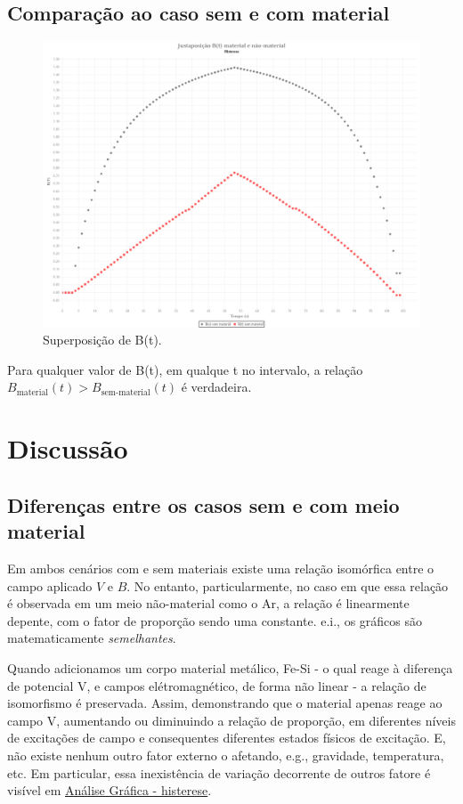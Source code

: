 \documentclass[11pt]{article}
\begin{document}
\subsection{Comparação ao caso sem e com material}
\label{sec:org3054bfb}
{\begin{figure}[htbp]

\includegraphics[width=.9\linewidth]{img-plots/B-justaposicao.png}
\caption{Superposição de B(t).}
\end{figure}}

Para qualquer valor de B(t), em qualque t no intervalo, a relação \(B_{\textrm{material}}(t)>B_{\textrm{sem-material}}(t)\) é verdadeira.

\section{Discussão}
\label{sec:orgeaf30e7}

\subsection{Diferenças entre os casos sem e com meio material}
\label{sec:orgd724b12}
Em ambos cenários  com e sem materiais existe uma relação isomórfica entre o campo aplicado \(V\) e \(B\). No entanto, particularmente, no caso em que essa relação é observada em um meio não-material como o Ar, a relação é linearmente depente, com o fator de proporção sendo uma constante. e.i., os gráficos são matematicamente \emph{semelhantes}.

Quando adicionamos um corpo material metálico, Fe-Si - o qual reage à diferença de potencial V, e campos elétromagnético, de forma não linear - a relação de isomorfismo é preservada. Assim, demonstrando que o material apenas reage ao campo V, aumentando ou diminuindo a relação de proporção, em diferentes níveis de excitações de campo e consequentes diferentes estados físicos de excitação. E, não existe nenhum outro fator externo o afetando, e.g., gravidade, temperatura, etc. Em particular, essa inexistência de variação decorrente de outros fatore é visível em \hyperref[sec:org34a6338]{Análise Gráfica - histerese}.
\end{document}
